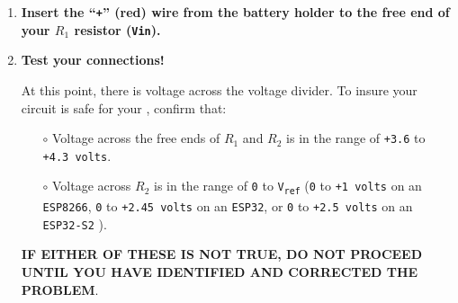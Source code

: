 \begin{enumerate}
	\item \textbf{Insert the ``\texttt{+}'' (red) wire from the battery holder to the free end of your $R_1$ resistor  (\texttt{Vin}).}

	\item \textbf{Test your connections!}

	At this point, there is voltage across the voltage divider.
	To insure your circuit is safe for your \adc, confirm that:
	\begin{itemize}
		\item[$\circ$] Voltage across the free ends of $R_1$ and $R_2$ is in the range of \texttt{+3.6} to \texttt{+4.3 volts}.
		\item[$\circ$] Voltage across $R_2$ is in the range of \texttt{0} to \texttt{V\textsubscript{ref}} (\texttt{0} to \texttt{+1 volts} on an \texttt{ESP8266}, \texttt{0} to \texttt{+2.45 volts} on an \texttt{ESP32}, or \texttt{0} to \texttt{+2.5 volts} on an \texttt{ESP32-S2} ).
	\end{itemize}
	\textbf{IF EITHER OF THESE IS NOT TRUE, DO NOT PROCEED UNTIL YOU HAVE IDENTIFIED AND CORRECTED THE PROBLEM}.


\end{enumerate}
